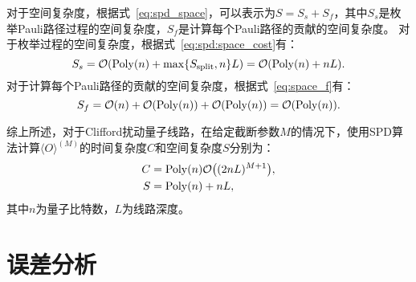 对于空间复杂度，根据式~\eqref{eq:spd_space}，可以表示为$S = S_s+S_f$，其中$S_s$是枚举Pauli路径过程的空间复杂度，$S_f$是计算每个Pauli路径的贡献的空间复杂度。
对于枚举过程的空间复杂度，根据式~\eqref{eq:spd:space_cost}有：
\begin{equation}
    S_{s}=\order{\mathrm{Poly}(n)+\max\{S_{\text{split}},n\}L}=\order{\mathrm{Poly}(n)+nL}.
\end{equation}
对于计算每个Pauli路径的贡献的空间复杂度，根据式~\eqref{eq:space_f}有：
\begin{equation}
    S_f=\order{n}+\order{\poly(n)}+\order{\poly(n)}=\order{\poly(n)}.
\end{equation}


综上所述，对于Clifford扰动量子线路，在给定截断参数$M$的情况下，使用SPD算法计算$\langle O \rangle ^{(M)}$的时间复杂度$C$和空间复杂度$S$分别为：
\begin{equation}\label{eq:cpc:cost}
    \begin{aligned}
        C&=\mathrm{Poly}(n) \order{(2nL)^{M+1}},\\
        S&=\mathrm{Poly}(n)+nL,
    \end{aligned}
\end{equation}
其中$n$为量子比特数，$L$为线路深度。

\section{误差分析}